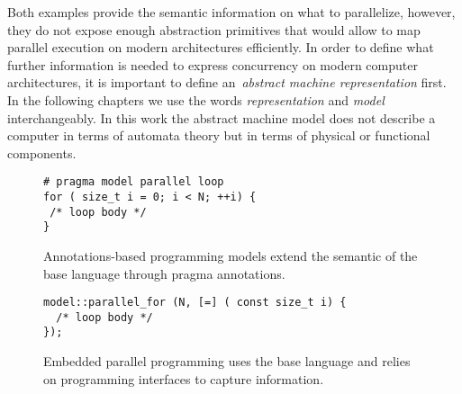 Both examples provide the semantic information on what to parallelize, however, they do not expose enough abstraction primitives that would allow to map parallel execution on modern architectures efficiently. In order to define what further information is needed to express concurrency on modern computer architectures, it is important to define an~\emph{abstract machine representation} first. In the following chapters we use the words \emph{representation} and \emph{model} interchangeably. In this work the abstract machine model does not describe a computer in terms of automata theory but in terms of physical or functional components.

\begin{figure}
\begin{Verbatim}[frame=leftline]
# pragma model parallel loop
for ( size_t i = 0; i < N; ++i) {
 /* loop body */
}
\end{Verbatim}
\caption{Annotations-based programming models extend the semantic of the base language through pragma annotations.}
\label{figOMPLike}
\end{figure}

\begin{figure}
\begin{Verbatim}[frame=leftline]
model::parallel_for (N, [=] ( const size_t i) {
  /* loop body */
});
\end{Verbatim}
\caption{Embedded parallel programming uses the base language and relies on programming interfaces to capture information.}
\label{figKokkosLike}
\end{figure}
